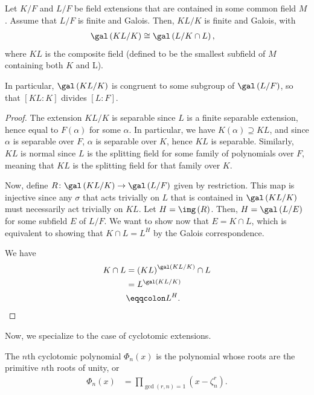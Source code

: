 \documentclass[10pt]{mypackage}
\begin{document}
\begin{proposition}
  Let $K/F$ and $L/F$ be field extensions that are contained in some common field $M$. Assume that $L/F$ is finite and Galois. Then, $KL/K$ is finite and Galois, with
  \begin{align*}
    \gal\left( KL/K \right) &\cong \gal\left( L/K\cap L \right),
  \end{align*}
  where $KL$ is the composite field (defined to be the smallest subfield of $M$ containing both $K$ and L).

  In particular, $\gal\left( KL/K \right)$ is congruent to some subgroup of $\gal\left( L/F \right)$, so that $\left[ KL:K \right]$ divides $\left[ L:F \right]$.
\end{proposition}
\begin{proof}
  The extension $KL/K$ is separable since $L$ is a finite separable extension, hence equal to $F(\alpha)$ for some $\alpha$. In particular, we have $K\left( \alpha \right)\supseteq KL$, and since $\alpha$ is separable over $F$, $\alpha$ is separable over $K$, hence $KL$ is separable. Similarly, $KL$ is normal since $L$ is the splitting field for some family of polynomials over $F$, meaning that $KL$ is the splitting field for that family over $K$.

  Now, define $R\colon \gal\left( KL/K \right)\rightarrow \gal\left( L/F \right)$ given by restriction. This map is injective since any $\sigma$ that acts trivially on $L$ that is contained in $\gal\left( KL/K \right)$ must necessarily act trivially on $KL$. Let $H = \img\left( R \right)$. Then, $H = \gal\left( L/E \right)$ for some subfield $E$ of $L/F$. We want to show now that $E = K\cap L$, which is equivalent to showing that $K\cap L = L^{H}$ by the Galois correspondence.

  We have
  \begin{align*}
    K\cap L &= \left( KL \right)^{\gal\left( KL/K \right)}\cap L\\
            &= L^{\gal\left( KL/K \right)}\\
            &\eqqcolon L^{H}.
  \end{align*}
\end{proof}
Now, we specialize to the case of cyclotomic extensions.
\begin{definition}
  The $n$th cyclotomic polynomial $\Phi_n(x)$ is the polynomial whose roots are the primitive $n$th roots of unity, or
  \begin{align*}
    \Phi_n(x) &= \prod_{\gcd\left( r,n \right) = 1} \left( x-\zeta_n^{r} \right).
  \end{align*}
\end{definition}
\end{document}
